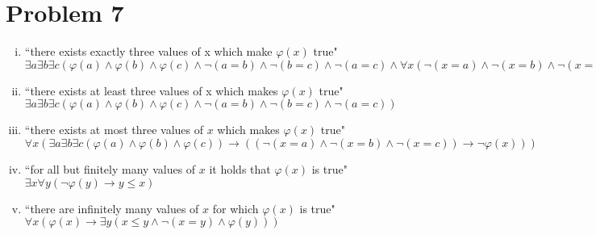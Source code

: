 \documentclass[11pt,leqno,fleqn]{article}
\begin{document}
\section{Problem 7}
\begin{enumerate}[(i)]
\item
``there exists exactly three values of x which make $\varphi(x)$ true" \\
$\exists a \exists b \exists c (\varphi(a) \land \varphi(b) \land \varphi(c) \land \neg(a = b) \land \neg(b = c) \land \neg(a = c) \land \forall x(\neg (x = a) \land \neg(x = b) \land \neg(x = c)) \to \neg \varphi(x))$
\\
\item
``there exists at least three values of x which makes $\varphi(x)$ true" \\
$\exists a \exists b \exists c (\varphi (a) \land \varphi(b) \land \varphi(c) \land \neg(a = b) \land \neg (b = c) \land \neg (a = c))$
\\
\item
``there exists at most three values of $x$ which makes $\varphi(x)$ true" \\
$\forall x(\exists a \exists b \exists c(\varphi(a) \land \varphi(b) \land \varphi(c)) \to ((\neg(x = a) \land \neg(x = b) \land \neg(x = c)) \to \neg \varphi(x)))$
\\
\item
``for all but finitely many values of $x$ it holds that $\varphi(x)$ is true" \\
$\exists x \forall y(\neg \varphi(y) \to y \leq x)$
\\
\item
``there are infinitely many values of $x$ for which $\varphi(x)$ is true" \\
$\forall x( \varphi(x) \to \exists y(x \leq y \land \neg(x = y) \land \varphi(y)))$
\end{enumerate}
\end{document}
